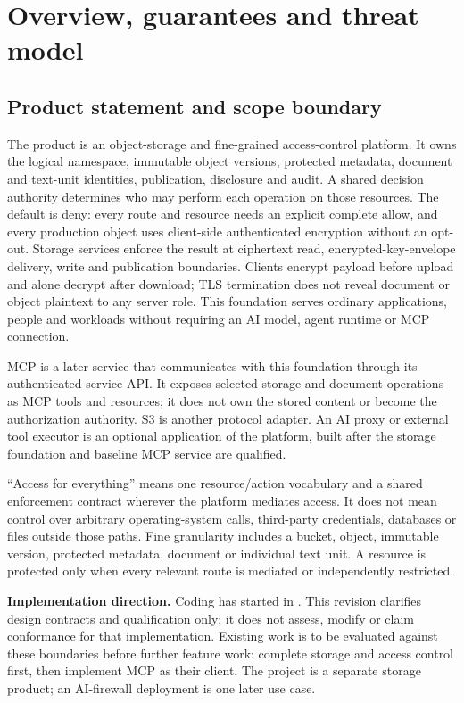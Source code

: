 \section{Overview, guarantees and threat model}\label{sec:overview}
\subsection{Product statement and scope boundary}
The product is an object-storage and fine-grained access-control platform. It owns the logical namespace, immutable object versions, protected metadata, document and text-unit identities, publication, disclosure and audit. A shared decision authority determines who may perform each operation on those resources. The default is deny: every route and resource needs an explicit complete allow, and every production object uses client-side authenticated encryption without an opt-out. Storage services enforce the result at ciphertext read, encrypted-key-envelope delivery, write and publication boundaries. Clients encrypt payload before upload and alone decrypt after download; TLS termination does not reveal document or object plaintext to any server role. This foundation serves ordinary applications, people and workloads without requiring an AI model, agent runtime or MCP connection.

MCP is a later service that communicates with this foundation through its authenticated service API. It exposes selected storage and document operations as MCP tools and resources; it does not own the stored content or become the authorization authority. S3 is another protocol adapter. An AI proxy or external tool executor is an optional application of the platform, built after the storage foundation and baseline MCP service are qualified.

``Access for everything'' means one resource/action vocabulary and a shared enforcement contract wherever the platform mediates access. It does not mean control over arbitrary operating-system calls, third-party credentials, databases or files outside those paths. Fine granularity includes a bucket, object, immutable version, protected metadata, document or individual text unit. A resource is protected only when every relevant route is mediated or independently restricted.

\textbf{Implementation direction.} Coding has started in . This revision clarifies design contracts and qualification only; it does not assess, modify or claim conformance for that implementation. Existing work is to be evaluated against these boundaries before further feature work: complete storage and access control first, then implement MCP as their client. The project is a separate storage product; an AI-firewall deployment is one later use case.

